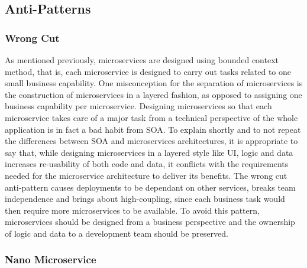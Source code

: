 \documentclass{Configuration_Files/PoliMi3i_thesis}
\begin{document}
\subsection{Anti-Patterns}
\label{subsec:antipattern}


\subsubsection{Wrong Cut}
\label{subsubsec:wrong_cut}

As mentioned previously, microservices are designed using bounded context method, that is, each microservice is designed to carry out tasks related to one small business capability.
One misconception for the separation of microservices is the construction of microservices in a layered fashion, as opposed to assigning one business capability per microservice.
Designing microservices so that each microservice takes care of a major task from a technical perspective of the whole application is in fact a bad habit from SOA.
To explain shortly and to not repeat the differences between SOA and microservices architectures, it is appropriate to say that, while designing microservices in a layered style like UI, logic and data increases re-usability of both code and data, it conflicts with the requirements needed for the microservice architecture to deliver its benefits.
The wrong cut anti-pattern causes deployments to be dependant on other services, breaks team independence and brings about high-coupling, since each business task would then require more microservices to be available.
To avoid this pattern, microservices should be designed from a business perspective and the ownership of logic and data to a development team should be preserved.

\subsubsection{Nano Microservice}
\label{subsubsec:nano_microservice}
\end{document}
